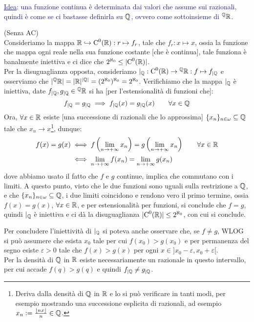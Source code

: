 \textcolor{MidnightBlue}{\underline{Idea}: una funzione continua è determinata dai valori che assume sui razionali, quindi è come se ci bastasse definirla su $\mathbb Q$, ovvero come sottoinsieme di ${}^\mathbb Q \mathbb R$.}

\begin{soln}
	(Senza AC)\\
	Consideriamo la mappa $\mathbb R \hookrightarrow \text C^0(\mathbb R) : r \mapsto f_r$, tale che $f_r : x \mapsto x$, ossia la funzione che mappa ogni reale nella sua funzione costante [che è continua], tale funziona è banalmente iniettiva
	e ci dice che $2^{\aleph_0} \leq |\text C^0(\mathbb R)|$.\\
	Per la disuguaglianza opposta, consideriamo $|_\mathbb Q : \text C^0(\mathbb R) \rightarrow {}^\mathbb Q \mathbb R : f \mapsto f_{|\mathbb Q}$ e osserviamo che $|{}^\mathbb Q \mathbb R| = |\mathbb R|^{|\mathbb Q|} = (2^{\aleph_0})^{\aleph_0} = 2^{\aleph_0}$. Verifichiamo che la mappa $|_{\mathbb Q}$ è iniettiva,
	date $f_{|\mathbb Q},g_{|\mathbb Q} \in {}^{\mathbb Q}\mathbb R$ si ha [per l'estensionalità di funzioni che]:
	\[ f_{|\mathbb Q} = g_{|\mathbb Q} \implies f_{|\mathbb Q}(x) = g_{|\mathbb Q}(x) \qquad \forall x \in \mathbb Q 
		\]
	Ora, $\forall x \in \mathbb R$ esiste [una successione di razionali che lo approssima] $\{x_n\}_{n\in \omega} \subseteq \mathbb Q$ tale che $x_n \to x$\footnote{Deriva dalla densità di $\mathbb Q$ in $\mathbb R$ e lo si può verificare in tanti modi,
	per esempio mostrando una successione esplicita di razionali, ad esempio $x_n := \frac{\left\lfloor nx\right\rfloor}{n} \in \mathbb Q$.}, dunque:
	\[ \begin{split}
		f(x) = g(x) &\iff f\left(\lim_{n \to +\infty} x_n\right) = g\left(\lim_{n \to +\infty} x_n\right) \qquad \forall x \in \mathbb R \\
					&\iff \lim_{n \to +\infty} f(x_n) = \lim_{n \to +\infty} g(x_n)
	\end{split}
		\]
	dove abbiamo usato il fatto che $f$ e $g$ continue, implica che commutano con i limiti. A questo punto, visto che le due funzioni sono uguali sulla restrizione a $\mathbb Q$, e che $\{x_n\}_{n \in \omega} \subseteq \mathbb Q$,
	i due limiti coincidono e rendono vero il primo termine, ossia $f(x) = g(x)$, $\forall x \in \mathbb R$,
	e per estensionalità per funzioni, si conclude che $f = g$, quindi $|_{\mathbb Q}$ è iniettiva e ci dà la disuguaglianza $|\text C^0(\mathbb R)| \leq 2^{\aleph_0}$, con cui si conclude.
\end{soln}

\begin{remark}
	Per concludere l'iniettività di $|_\mathbb Q$ si poteva anche osservare che, se $f \ne g$, WLOG si può assumere che esista $x_0$ tale per cui $f(x_0) > g(x_0)$ e per permanenza del segno esiste $\varepsilon > 0$ tale che $f(x) > g(x)$ per ogni $x \in ]x_0 - \varepsilon, x_0 + \varepsilon[$.\\
	Per la densità di $\mathbb Q$ in $\mathbb R$ esiste necessariamente un razionale in questo intervallo, per cui accade $f(q) > g(q)$ e quindi $f_{|\mathbb Q} \ne g_{|\mathbb Q}$. 
\end{remark}

